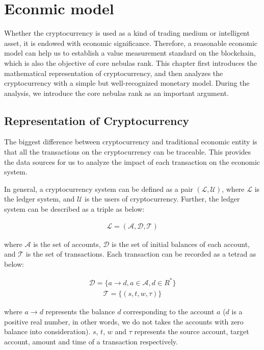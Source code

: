 \section{Econmic model}
Whether the cryptocurrency is used as a kind of trading medium or intelligent asset, it is endowed with economic significance. Therefore, a reasonable economic model can help us to establish a value measurement standard on the blockchain, which is also the objective of core nebulas rank. This chapter first introduces the mathematical representation of cryptocurrency, and then analyzes the cryptocurrency with a simple but well-recognized monetary model. During the analysis, we introduce the core nebulas rank as an important argument.

\subsection{Representation of Cryptocurrency}
The biggest difference between cryptocurrency and traditional economic entity is that all the transactions on the cryptocurrency can be traceable. This provides the data sources for us to analyze the impact of each transaction on the economic system.

In general, a cryptocurrency system can be defined as a pair $(\mathcal{L}, \mathcal{U})$, where $\mathcal{L}$ is the ledger system, and $\mathcal{U}$ is the users of cryptocurrency. Further, the ledger system can be described as a triple as below:

\begin{align}
\mathcal{L} = (\mathcal{A}, \mathcal{D}, \mathcal{T})
\end{align}

\noindent where $\mathcal{A}$ is the set of accounts, $\mathcal{D}$ is the set of initial balances of each account, and $\mathcal{T}$ is the set of transactions. Each transaction can be recorded as a tetrad as below:

\begin{align}
\mathcal{D} = \{a \rightarrow d, a{\in}\mathcal{A}, d{\in}R^*\}
\end{align}
\begin{align}
\mathcal{T} = \{(s, t, w, \tau)\}
\end{align}

\noindent where $a \rightarrow d$ represents the balance $d$ corresponding to the account $a$ ($d$ is a positive real number, in other words, we do not takes the accounts with zero balance into consideration). $s$, $t$, $w$ and $\tau$ represents the source account, target account, amount and time of a transaction respectively.

